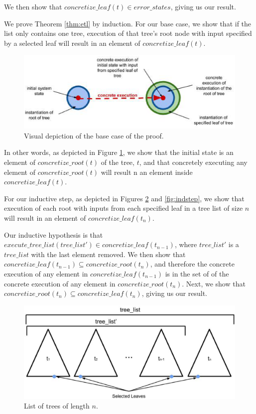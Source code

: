 We then show that $concretize\_leaf (t) \in error\_states$, giving us our result.

We prove Theorem \ref{thm:etl} by induction. 
For our base case, we show that if the list only contains one tree, execution of that tree's root node with input specified by a selected leaf will result in an element of $concretize\_leaf (t)$.

\begin{figure}
\centering
\includegraphics[width=.8\textwidth]{set3.eps}
\caption{Visual depiction of the base case of the proof.}
\label{fig:basecase}
\end{figure}

In other words, as depicted in Figure \ref{fig:basecase}, we show that the initial state is an element of $concretize\_root(t)$ of the tree, $t$, and that concretely executing any element of $concretize\_root(t)$ will result n an element inside $concretize\_leaf(t).$



For our inductive step, as depicted in Figures  \ref{fig:tlist} and \ref{fig:indstep}, we show that execution of each root with inputs from each specified leaf in a tree list of size $n$ will result in an element of $concretize\_leaf(t_n)$.

Our inductive hypothesis is that $execute\_tree\_list (tree\_list') \in concretize\_leaf (t_{n-1})$, where $tree\_list'$ is a $tree\_list$ with the last element removed. We then show that $concretize\_leaf (t_{n-1}) \subseteq concretize\_root (t_{n}) $, and therefore the concrete execution of any element in $concretize\_leaf (t_{n-1}) $ is in the set of of the concrete execution of any element in $concretize\_root (t_{n})$. Next, we show that $concretize\_root (t_{n}) \subseteq concretize\_leaf (t_{n})$, giving us our result.
 
\begin{figure}
\centering
\includegraphics[width=.8\textwidth]{tlist.eps}
\caption{List of trees of length $n$.}
\label{fig:tlist}
\end{figure}

